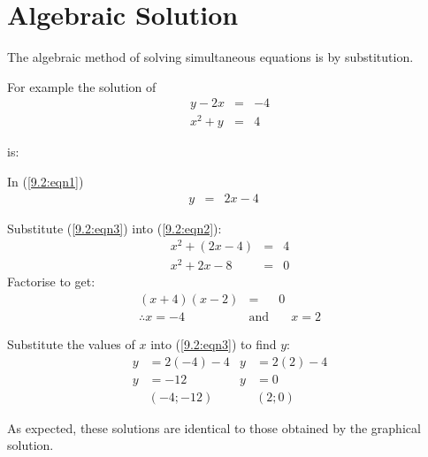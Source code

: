 \section{Algebraic Solution}
The algebraic method of solving simultaneous equations is by substitution.

For example the solution of
\begin{eqnarray}
y - 2x &=& -4 \label{9.2:eqn1}\\
x^2 + y &=& 4 \label{9.2:eqn2}
\end{eqnarray}

is:\\
\newline

In (\ref{9.2:eqn1})
\begin{eqnarray}
y &=& 2x - 4 \quad \label{9.2:eqn3}
\end{eqnarray}

Substitute (\ref{9.2:eqn3}) into (\ref{9.2:eqn2}):
\begin{eqnarray*}
x^2 + (2x - 4) &=& 4\\
x^2 + 2x - 8 &=& 0
\end{eqnarray*}
Factorise to get:
\begin{eqnarray*}
 (x + 4)(x - 2) &=& 0\\
\therefore x = -4 \quad &\mbox{and}& \quad x=2
\end{eqnarray*}

Substitute the values of $x$ into (\ref{9.2:eqn3}) to find $y$:
\begin{align*}
 y &= 2(-4) -4		&	y &= 2(2) - 4\\
 y &= -12		&	y &= 0\\
 &(-4;-12)		&	&(2;0)
\end{align*}

As expected, these solutions are identical to those obtained by the graphical solution.

